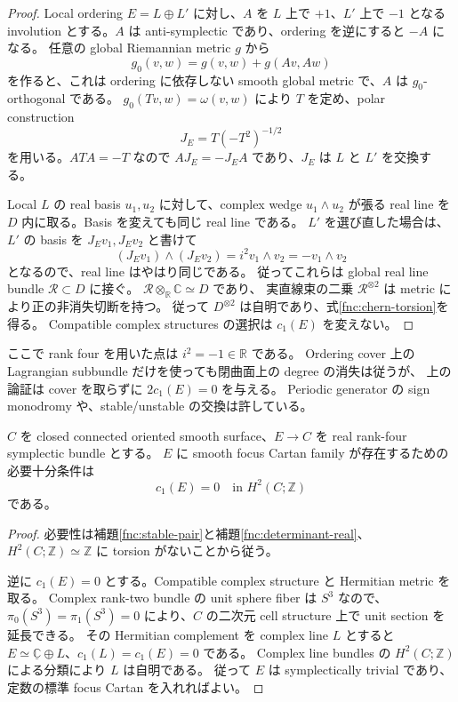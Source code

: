 \begin{proof}
Local ordering $E=L\oplus L'$ に対し、$A$ を $L$ 上で $+1$、$L'$ 上で $-1$ となる
involution とする。$A$ は anti-symplectic であり、ordering を逆にすると $-A$ になる。
任意の global Riemannian metric $g$ から
\[
 g_0(v,w)=g(v,w)+g(Av,Aw)
\]
を作ると、これは ordering に依存しない smooth global metric で、$A$ は $g_0$-orthogonal である。
$g_0(Tv,w)=\omega(v,w)$ により $T$ を定め、polar construction
\[
 J_E=T(-T^2)^{-1/2}
\]
を用いる。$ATA=-T$ なので $AJ_E=-J_EA$ であり、$J_E$ は $L$ と $L'$ を交換する。

Local $L$ の real basis $u_1,u_2$ に対して、complex wedge $u_1\wedge u_2$ が張る
real line を $D$ 内に取る。Basis を変えても同じ real line である。
$L'$ を選び直した場合は、$L'$ の basis を $J_Ev_1,J_Ev_2$ と書けて
\[
 (J_Ev_1)\wedge(J_Ev_2)=i^2v_1\wedge v_2=-v_1\wedge v_2
\]
となるので、real line はやはり同じである。
従ってこれらは global real line bundle $\mathcal R\subset D$ に接ぐ。
$\mathcal R\otimes_{\mathbb R}\mathbb C\simeq D$ であり、
実直線束の二乗 $\mathcal R^{\otimes2}$ は metric により正の非消失切断を持つ。
従って $D^{\otimes2}$ は自明であり、式\eqref{fnc:chern-torsion}を得る。
Compatible complex structures の選択は $c_1(E)$ を変えない。
\end{proof}

ここで rank four を用いた点は $i^2=-1\in\mathbb R$ である。
Ordering cover 上の Lagrangian subbundle だけを使っても閉曲面上の degree の消失は従うが、
上の論証は cover を取らずに $2c_1(E)=0$ を与える。
Periodic generator の sign monodromy や、stable/unstable の交換は許している。

\begin{theorem}\label{fnc:surface-criterion}
$C$ を closed connected oriented smooth surface、$E\to C$ を real rank-four symplectic bundle とする。
$E$ に smooth focus Cartan family が存在するための必要十分条件は
\[
 c_1(E)=0\quad\text{in }H^2(C;\mathbb Z)
\]
である。
\end{theorem}

\begin{proof}
必要性は補題\ref{fnc:stable-pair}と補題\ref{fnc:determinant-real}、
$H^2(C;\mathbb Z)\simeq\mathbb Z$ に torsion がないことから従う。

逆に $c_1(E)=0$ とする。Compatible complex structure と Hermitian metric を取る。
Complex rank-two bundle の unit sphere fiber は $S^3$ なので、
$\pi_0(S^3)=\pi_1(S^3)=0$ により、$C$ の二次元 cell structure 上で unit section を延長できる。
その Hermitian complement を complex line $L$ とすると
$E\simeq\underline{\mathbb C}\oplus L$、$c_1(L)=c_1(E)=0$ である。
Complex line bundles の $H^2(C;\mathbb Z)$ による分類により $L$ は自明である。
従って $E$ は symplectically trivial であり、定数の標準 focus Cartan を入れればよい。
\end{proof}

